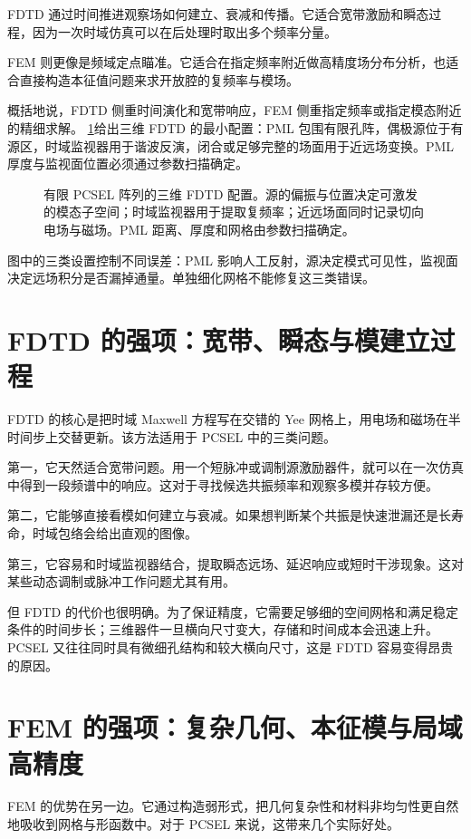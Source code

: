 FDTD 通过时间推进观察场如何建立、衰减和传播。它适合宽带激励和瞬态过程，因为一次时域仿真可以在后处理时取出多个频率分量。

FEM 则更像是频域定点瞄准。它适合在指定频率附近做高精度场分布分析，也适合直接构造本征值问题来求开放腔的复频率与模场。

概括地说，FDTD 侧重时间演化和宽带响应，FEM 侧重指定频率或指定模态附近的精细求解。
\cref{fig:ch14_fdtd_setup}给出三维 FDTD 的最小配置：PML 包围有限孔阵，偶极源位于有源区，时域监视器用于谐波反演，闭合或足够完整的场面用于近远场变换。PML 厚度与监视面位置必须通过参数扫描确定\cite{berenger1994,taflove2005}。

\begin{figure}[htbp]
  \centering
  
  \caption{有限 PCSEL 阵列的三维 FDTD 配置。源的偏振与位置决定可激发的模态子空间；时域监视器用于提取复频率；近远场面同时记录切向电场与磁场。PML 距离、厚度和网格由参数扫描确定\cite{taflove2005}。}
  \label{fig:ch14_fdtd_setup}
\end{figure}

图中的三类设置控制不同误差：PML 影响人工反射，源决定模式可见性，监视面决定远场积分是否漏掉通量。单独细化网格不能修复这三类错误。

\section{FDTD 的强项：宽带、瞬态与模建立过程}
FDTD 的核心是把时域 Maxwell 方程写在交错的 Yee 网格上，用电场和磁场在半时间步上交替更新。该方法适用于 PCSEL 中的三类问题。

第一，它天然适合宽带问题。用一个短脉冲或调制源激励器件，就可以在一次仿真中得到一段频谱中的响应。这对于寻找候选共振频率和观察多模并存较方便。

第二，它能够直接看模如何建立与衰减。如果想判断某个共振是快速泄漏还是长寿命，时域包络会给出直观的图像。

第三，它容易和时域监视器结合，提取瞬态远场、延迟响应或短时干涉现象。这对某些动态调制或脉冲工作问题尤其有用。

但 FDTD 的代价也很明确。为了保证精度，它需要足够细的空间网格和满足稳定条件的时间步长；三维器件一旦横向尺寸变大，存储和时间成本会迅速上升。PCSEL 又往往同时具有微细孔结构和较大横向尺寸，这是 FDTD 容易变得昂贵的原因。

\section{FEM 的强项：复杂几何、本征模与局域高精度}
FEM 的优势在另一边。它通过构造弱形式，把几何复杂性和材料非均匀性更自然地吸收到网格与形函数中。对于 PCSEL 来说，这带来几个实际好处。

